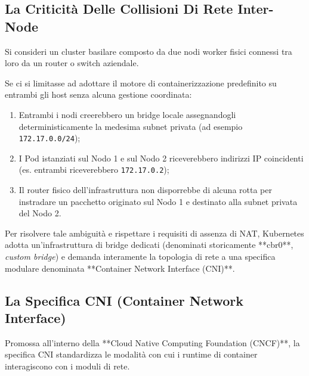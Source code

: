 \documentclass[11pt, a4paper]{article}
\begin{document}
\subsection{La Criticità Delle Collisioni Di Rete Inter-Node}

Si consideri un cluster basilare composto da due nodi worker fisici connessi tra loro da un router o switch aziendale.


Se ci si limitasse ad adottare il motore di containerizzazione predefinito su entrambi gli host senza alcuna gestione coordinata:
\begin{enumerate}[noitemsep]
    \item Entrambi i nodi creerebbero un bridge locale assegnandogli deterministicamente la medesima subnet privata (ad esempio \texttt{172.17.0.0/24});
    \item I Pod istanziati sul Nodo 1 e sul Nodo 2 riceverebbero indirizzi IP coincidenti (es. entrambi riceverebbero \texttt{172.17.0.2});
    \item Il router fisico dell'infrastruttura non disporrebbe di alcuna rotta per instradare un pacchetto originato sul Nodo 1 e destinato alla subnet privata del Nodo 2.
\end{enumerate}


Per risolvere tale ambiguità e rispettare i requisiti di assenza di NAT, Kubernetes adotta un'infrastruttura di bridge dedicati (denominati storicamente **cbr0**, \emph{custom bridge}) e demanda interamente la topologia di rete a una specifica modulare denominata **Container Network Interface (CNI)**.

\subsection{La Specifica CNI (Container Network Interface)}

Promossa all'interno della **Cloud Native Computing Foundation (CNCF)**, la specifica CNI standardizza le modalità con cui i runtime di container interagiscono con i moduli di rete.
\end{document}
